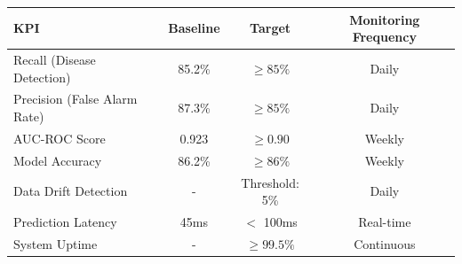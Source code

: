 \begin{tabular}{|l|c|c|c|}
\hline
\textbf{KPI} & \textbf{Baseline} & \textbf{Target} & \textbf{Monitoring Frequency} \\
\hline
Recall (Disease Detection) & 85.2\% & $\geq 85\%$ & Daily \\
\hline
Precision (False Alarm Rate) & 87.3\% & $\geq 85\%$ & Daily \\
\hline
AUC-ROC Score & 0.923 & $\geq 0.90$ & Weekly \\
\hline
Model Accuracy & 86.2\% & $\geq 86\%$ & Weekly \\
\hline
Data Drift Detection & - & Threshold: 5\% & Daily \\
\hline
Prediction Latency & 45ms & $<$ 100ms & Real-time \\
\hline
System Uptime & - & $\geq 99.5\%$ & Continuous \\
\hline
\end{tabular}
